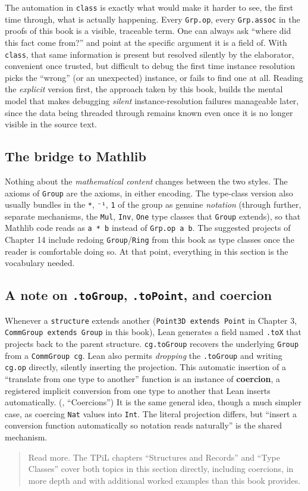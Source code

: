 The automation in \texttt{class} is exactly what would make it harder to see, the first time through, what is actually happening. Every \texttt{Grp.op}, every \texttt{Grp.assoc} in the proofs of this book is a visible, traceable term. One can always ask ``where did this fact come from?'' and point at the specific argument it is a field of. With \texttt{class}, that same information is present but resolved silently by the elaborator, convenient once trusted, but difficult to debug the first time instance resolution picks the ``wrong'' (or an unexpected) instance, or fails to find one at all. Reading the \emph{explicit} version first, the approach taken by this book, builds the mental model that makes debugging \emph{silent} instance-resolution failures manageable later, since the data being threaded through remains known even once it is no longer visible in the source text.

\subsection{The bridge to Mathlib}\label{sec:06-rigor-check:01-structure-vs-class:4}

Nothing about the \emph{mathematical content} changes between the two styles. The axioms of \texttt{Group} are the axioms, in either encoding. The type-class version also usually bundles in the \texttt{*}, \texttt{⁻¹}, \texttt{1} of the group as genuine \emph{notation} (through further, separate mechanisms, the \texttt{Mul}, \texttt{Inv}, \texttt{One} type classes that \texttt{Group} extends), so that Mathlib code reads as \texttt{a * b} instead of \texttt{Grp.op a b}. The suggested projects of Chapter 14 include redoing \texttt{Group}/\texttt{Ring} from this book as type classes once the reader is comfortable doing so. At that point, everything in this section is the vocabulary needed.

\subsection{\texorpdfstring{A note on \texttt{.toGroup}, \texttt{.toPoint}, and coercion}{A note on .toGroup, .toPoint, and coercion}}\label{sec:06-rigor-check:01-structure-vs-class:5}

Whenever a \texttt{structure} extends another (\texttt{Point3D extends Point} in Chapter 3, \texttt{CommGroup extends Group} in this book), Lean generates a field named \texttt{.toX} that projects back to the parent structure. \texttt{cg.toGroup} recovers the underlying \texttt{Group} from a \texttt{CommGroup cg}. Lean also permits \emph{dropping} the \texttt{.toGroup} and writing \texttt{cg.op} directly, silently inserting the projection. This automatic insertion of a ``translate from one type to another'' function is an instance of \textbf{coercion}, a registered implicit conversion from one type to another that Lean inserts automatically. (\cite{TPIL4}, ``Coercions'') It is the same general idea, though a much simpler case, as coercing \texttt{Nat} values into \texttt{Int}. The literal projection differs, but ``insert a conversion function automatically so notation reads naturally'' is the shared mechanism.

\begin{quote}
Read more. The TPiL chapters ``Structures and Records'' and ``Type Classes'' cover both topics in this section directly, including coercions, in more depth and with additional worked examples than this book provides.
\end{quote}
